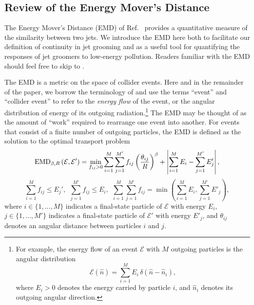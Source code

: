 \documentclass[letterpaper,11pt]{article}
\begin{document}
\subsection{Review of the Energy Mover's Distance}
\label{sec:emd}
The Energy Mover's Distance (EMD) of Ref.~\cite{Komiske:2019fks} provides a quantitative measure of the similarity between two jets.
%
We introduce the EMD here both to facilitate our definition of continuity in jet grooming and as a useful tool for quantifying the responses of jet groomers to low-energy pollution.
%
Readers familiar with the EMD should feel free to skip to .

The EMD is a metric on the space of collider events.
%
Here and in the remainder of the paper, we borrow the terminology of  and use the terms ``event'' and ``collider event'' to refer to the \textit{energy flow} of the event, or the angular distribution of energy of its outgoing radiation.\footnote{
For example, the energy flow of an event \(\mathcal E\) with \(M\) outgoing particles is the angular distribution
\begin{equation*}
    \label{eqn:energyflow}
    \mathcal E(\hat n)
    =
    \sum_{i=1}^ME_i\,\delta(\hat n - \hat n_i),
\end{equation*}
where $E_i > 0$ denotes the energy carried by particle \(i\), and $\hat n_i$ denotes its outgoing angular direction.
}
%
The EMD may be thought of as the amount of ``work'' required to rearrange one event into another.
%
For events that consist of a finite number of outgoing particles, the EMD is defined as the solution to the optimal transport problem
\begin{equation}
    \label{eqn:EMD_def_1}
    {\rm EMD}_{\beta, R}\left(\mathcal{E}, \mathcal{E}'\right)
    =
    \min_{f_{ij} > 0} \sum_{i = 1}^M \sum_{j = 1}^{M'} f_{ij} \left(\frac{\theta_{ij}}{R}\right)^\beta
    +
    \left| \sum_{i = 1}^M E_i -  \sum_{j = 1}^{M'} E'_j\right|,
\end{equation}
\begin{equation}
    \sum_{i = 1}^M f_{ij} \leq E_j',
    ~~
    \sum_{j = 1}^{M'} f_{ij} \leq E_i,
    ~~
    \sum_{i = 1}^M \sum_{j = 1}^{M'} f_{ij}
    = \min\left(\sum_{i = 1}^M E_i, \sum_{j = 1}^{M'} E'_j\right)
    \label{eqn:EMD_def_2}
    ,
\end{equation}
where \(i \in \{1, ..., M\}\) indicates a final-state particle of \(\mathcal{E}\) with energy \(E_i\), \(j \in \{1, ..., M'\}\) indicates a final-state particle of \(\mathcal{E}'\) with energy \(E'_j\), and \(\theta_{ij}\) denotes an angular distance between particles \(i\) and \(j\).
\end{document}
